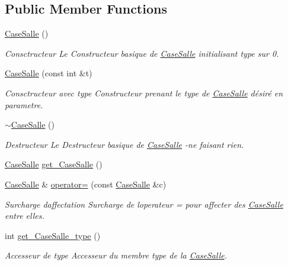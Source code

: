 \subsection*{Public Member Functions}
\begin{DoxyCompactItemize}
\item 
\hyperlink{classCaseSalle_a4252822534722fccb7d8355f79d7f244}{Case\+Salle} ()
\begin{DoxyCompactList}\small\item\em Consctructeur Le Constructeur basique de \hyperlink{classCaseSalle}{Case\+Salle} initialisant type sur 0. \end{DoxyCompactList}\item 
\hyperlink{classCaseSalle_a470fc8fdb01879fd5405392909775fe6}{Case\+Salle} (const int \&t)
\begin{DoxyCompactList}\small\item\em Consctructeur avec type Constructeur prenant le type de \hyperlink{classCaseSalle}{Case\+Salle} désiré en parametre. \end{DoxyCompactList}\item 
\hyperlink{classCaseSalle_aca43a910dbbb59bdac7af10faa5b3f39}{$\sim$\+Case\+Salle} ()
\begin{DoxyCompactList}\small\item\em Destructeur Le Destructeur basique de \hyperlink{classCaseSalle}{Case\+Salle} -\/ne faisant rien. \end{DoxyCompactList}\item 
\hyperlink{classCaseSalle}{Case\+Salle} \hyperlink{classCaseSalle_a7b85096b9782b5d52089651c69f92bee}{get\+\_\+\+Case\+Salle} ()
\item 
\hyperlink{classCaseSalle}{Case\+Salle} \& \hyperlink{classCaseSalle_a8494bda87f21c608d7da7bb510c0e525}{operator=} (const \hyperlink{classCaseSalle}{Case\+Salle} \&c)
\begin{DoxyCompactList}\small\item\em Surcharge d\textquotesingle{}affectation Surcharge de l\textquotesingle{}operateur = pour affecter des \hyperlink{classCaseSalle}{Case\+Salle} entre elles. \end{DoxyCompactList}\item 
int \hyperlink{classCaseSalle_a0a2939d0c9c02c9ed643e040f8f9bfce}{get\+\_\+\+Case\+Salle\+\_\+type} ()
\begin{DoxyCompactList}\small\item\em Accesseur de {\itshape type} Accesseur du membre {\itshape type} de la \hyperlink{classCaseSalle}{Case\+Salle}. \end{DoxyCompactList}\item 

\end{DoxyCompactItemize}
